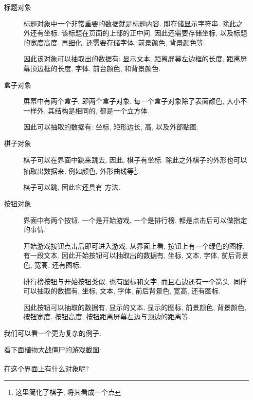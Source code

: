 \begin{description}
\item[标题对象]
    标题对象中一个非常重要的数据就是标题内容. 即存储显示字符串. 除此之外还有坐标.
    该标题在页面的上部的正中间. 因此还需要存储坐标, 以及标题的宽度高度. 再细化,
    还需要存储字体, 前景颜色, 背景颜色等.

    因此该对象可以抽取出的数据有: 显示文本, 距离屏幕左边框的长度, 
    距离屏幕顶边框的长度, 字体, 前台颜色, 和背景颜色.
\item[盒子对象]
    屏幕中有两个盒子, 即两个盒子对象. 每一个盒子对象除了表面颜色, 大小不一样外, 
    其结构是相同的, 都是一个立方体. 
    
    因此可以抽取的数据有: 坐标, 矩形边长, 高, 以及外部贴图.
\item[棋子对象]
    棋子可以在界面中跳来跳去, 因此, 棋子有坐标. 除此之外棋子的外形也可以抽取出数据来.
    例如颜色, 外形曲线等\footnote{这里简化了棋子, 将其看成一个点}. 

    棋子可以跳, 因此它还具有\,\,方法.
\item[按钮对象]
    界面中有两个按钮, 一个是开始游戏, 一个是排行榜. 都是点击后可以做指定的事情.

    开始游戏按钮点击后即可进入游戏. 从界面上看, 按钮上有一个绿色的图标, 有一段文本.
    因此开始按钮可以抽取出的数据有, 坐标, 文本, 字体, 前后背景色, 宽高, 还有图标.

    排行榜按钮与开始按钮类似, 也有图标和文字, 而且右边还有一个箭头. 
    同样可以抽取的数据有, 坐标, 文本, 字体, 前后背景色, 宽高, 还有图标.

    因此按钮可以抽取的数据有, 显示的文本, 显示的图标, 前景颜色, 背景颜色, 按钮宽度,
    按钮高度, 按钮距离屏幕左边与顶边的距离等.
\end{description}



我们可以看一个更为复杂的例子:

\begin{jdemo}
看下面植物大战僵尸的游戏截图:\\[0.5em]

\noindent{}
\\[1em]
\noindent 在这个界面上有什么对象呢?

\end{jdemo}

